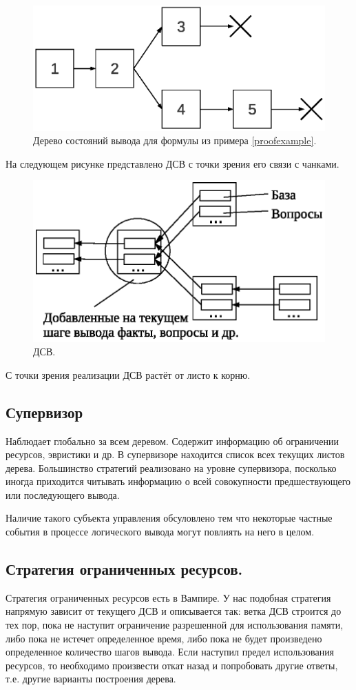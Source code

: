 \begin{figure}[h]
	\centering
	\includegraphics[width=0.4\linewidth]{pics/PST.eps}
	\caption{Дерево состояний вывода для формулы из примера \ref{proofexample}.}
	\label{fig:pst}
\end{figure}

На следующем рисунке представлено ДСВ с точки зрения его связи с чанками.

\begin{figure}[h]
	\centering
	\includegraphics[width=0.6\linewidth]{pics/PST2.eps}
	\caption{ДСВ.}
	\label{fig:pst2}
\end{figure}

С точки зрения реализации ДСВ растёт от листо к корню.



\subsection{Супервизор}
Наблюдает глобально за всем деревом. Содержит информацию об ограничении ресурсов, эвристики и др.
В супервизоре находится список всех текущих листов дерева.
Большинство стратегий реализовано на уровне супервизора, посколько иногда приходится читывать информацию о всей совокупности предшествующего или последующего вывода.

Наличие такого субъекта управления обсуловлено тем что некоторые частные события в процессе логического вывода могут повлиять на него в целом.

\subsection{Стратегия ограниченных ресурсов.}
Стратегия ограниченных ресурсов есть в Вампире. У нас подобная стратегия напрямую зависит от текущего ДСВ и описывается так: ветка ДСВ строится до тех пор, пока не наступит ограничение разрешенной для использования памяти, либо пока не истечет определенное время, либо пока не будет произведено определенное количество шагов вывода. Если наступил предел использования ресурсов, то необходимо произвести откат назад и попробовать другие ответы, т.е. другие варианты построения дерева.

